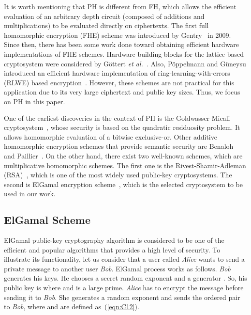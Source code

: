 \documentclass[conference]{IEEEtran}
\begin{document}
It is worth mentioning that PH is different from FH, which allows the efficient evaluation of an arbitrary depth circuit (composed of additions and multiplications) to be evaluated directly on ciphertexts. The first full homomorphic encryption (FHE) scheme was introduced by Gentry{\color{blue}~\cite{phD:Gentry}} in 2009. Since then, there has been some work done toward obtaining efficient hardware implementations of FHE schemes. Hardware building blocks for the lattice-based cryptosystem were considered by G\"{o}ttert \textit{et al.}{\color{blue}~\cite{Gottert:2012}}. Also, P\"{o}ppelmann and G\"{u}neysu introduced an efficient hardware implementation of ring-learning-with-errors (RLWE) based encryption{\color{blue}~\cite{Thomas12}}. However, these schemes are not practical for this application due to its very large ciphertext and public key sizes. Thus, we focus on PH in this paper. 

One of the earliest discoveries in the context of PH is the Goldwasser-Micali cryptosystem{\color{blue}~\cite{jour:Goldwasser84}}, whose security is based on the quadratic residuosity problem. It allows homomorphic evaluation of a bitwise exclusive-or. Other additive homomorphic encryption schemes that provide semantic security are Benaloh{\color{blue}~\cite{jour:Clarkson94}} and Paillier{\color{blue}~\cite{Paillier99}}. On the other hand, there exist two well-known schemes, which are multiplicative homomorphic schemes. The first one is the Rivest-Shamir-Adleman (RSA){\color{blue}~\cite{conf:RSA78}}, which is one of the most widely used public-key cryptosystems. The second is ElGamal encryption scheme{\color{blue}~\cite{ElGamal85}}, which is the selected cryptosystem to be used in our work. 




\subsection{ElGamal Scheme} \label{sub:ElGamal}
ElGamal public-key cryptography algorithm is considered to be one of the efficient and popular algorithms that provides a high level of security. To illustrate its functionality, let us consider that a user called \textit{Alice} wants to send a private message  to another user \textit{Bob}. ElGamal process works as follows. \textit{Bob} generates his keys. He chooses a secret random exponent  and a generator . So, his public key is  where  and  is a large prime. \textit{Alice} has to encrypt the message  before sending it to \textit{Bob}. She generates a random exponent  and sends the ordered pair  to \textit{Bob}, where  and  are defined as~(\ref{eqn:C12}).    
\end{document}
